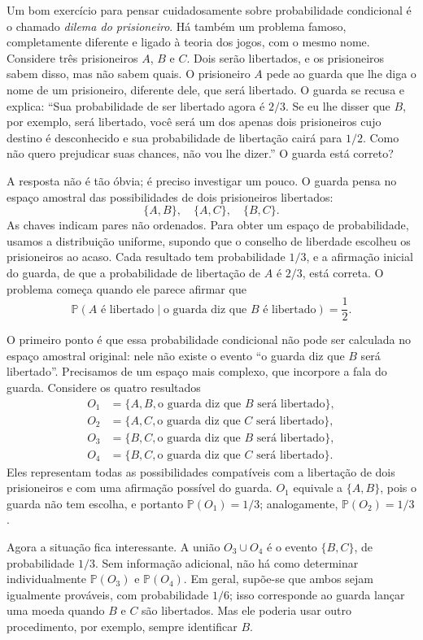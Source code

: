 Um bom exercício para pensar cuidadosamente sobre probabilidade condicional é o chamado \emph{dilema do prisioneiro}. Há também um problema famoso, completamente diferente e ligado à teoria dos jogos, com o mesmo nome. Considere três prisioneiros $A$, $B$ e $C$. Dois serão libertados, e os prisioneiros sabem disso, mas não sabem quais. O prisioneiro $A$ pede ao guarda que lhe diga o nome de um prisioneiro, diferente dele, que será libertado. O guarda se recusa e explica: ``Sua probabilidade de ser libertado agora é $2/3$. Se eu lhe disser que $B$, por exemplo, será libertado, você será um dos apenas dois prisioneiros cujo destino é desconhecido e sua probabilidade de libertação cairá para $1/2$. Como não quero prejudicar suas chances, não vou lhe dizer.'' O guarda está correto?

A resposta não é tão óbvia; é preciso investigar um pouco. O guarda pensa no espaço amostral das possibilidades de dois prisioneiros libertados:
\[
\{A,B\},\quad \{A,C\},\quad \{B,C\}.
\]
As chaves indicam pares não ordenados. Para obter um espaço de probabilidade, usamos a distribuição uniforme, supondo que o conselho de liberdade escolheu os prisioneiros ao acaso. Cada resultado tem probabilidade $1/3$, e a afirmação inicial do guarda, de que a probabilidade de libertação de $A$ é $2/3$, está correta. O problema começa quando ele parece afirmar que
\[
\mathbb{P}(A\text{ é libertado}\mid\text{o guarda diz que }B\text{ é libertado})=\frac12.
\]

O primeiro ponto é que essa probabilidade condicional não pode ser calculada no espaço amostral original: nele não existe o evento ``o guarda diz que $B$ será libertado''. Precisamos de um espaço mais complexo, que incorpore a fala do guarda. Considere os quatro resultados
\[
\begin{aligned}
O_1&=\{A,B,\text{o guarda diz que }B\text{ será libertado}\},\\
O_2&=\{A,C,\text{o guarda diz que }C\text{ será libertado}\},\\
O_3&=\{B,C,\text{o guarda diz que }B\text{ será libertado}\},\\
O_4&=\{B,C,\text{o guarda diz que }C\text{ será libertado}\}.
\end{aligned}
\]
Eles representam todas as possibilidades compatíveis com a libertação de dois prisioneiros e com uma afirmação possível do guarda. $O_1$ equivale a $\{A,B\}$, pois o guarda não tem escolha, e portanto $\mathbb{P}(O_1)=1/3$; analogamente, $\mathbb{P}(O_2)=1/3$.

Agora a situação fica interessante. A união $O_3\cup O_4$ é o evento $\{B,C\}$, de probabilidade $1/3$. Sem informação adicional, não há como determinar individualmente $\mathbb{P}(O_3)$ e $\mathbb{P}(O_4)$. Em geral, supõe-se que ambos sejam igualmente prováveis, com probabilidade $1/6$; isso corresponde ao guarda lançar uma moeda quando $B$ e $C$ são libertados. Mas ele poderia usar outro procedimento, por exemplo, sempre identificar $B$.

